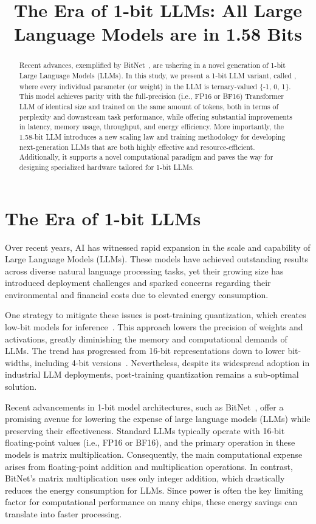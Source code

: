\title{The Era of 1-bit LLMs: All Large Language Models are in 1.58 Bits}

\begin{abstract}
Recent advances, exemplified by BitNet~\cite{bitnet}, are ushering in a novel generation of 1-bit Large Language Models (LLMs). In this study, we present a 1-bit LLM variant, called \textbf{}, where every individual parameter (or weight) in the LLM is ternary-valued \{-1, 0, 1\}. This model achieves parity with the full-precision (i.e., FP16 or BF16) Transformer LLM of identical size and trained on the same amount of tokens, both in terms of perplexity and downstream task performance, while offering substantial improvements in latency, memory usage, throughput, and energy efficiency. More importantly, the 1.58-bit LLM introduces a new scaling law and training methodology for developing next-generation LLMs that are both highly effective and resource-efficient. Additionally, it supports a novel computational paradigm and paves the way for designing specialized hardware tailored for 1-bit LLMs.
\end{abstract}

\section{The Era of 1-bit LLMs}

Over recent years, AI has witnessed rapid expansion in the scale and capability of Large Language Models (LLMs). These models have achieved outstanding results across diverse natural language processing tasks, yet their growing size has introduced deployment challenges and sparked concerns regarding their environmental and financial costs due to elevated energy consumption.

One strategy to mitigate these issues is post-training quantization, which creates low-bit models for inference~\cite{smoothquant, gptq, quip, quip_sharp}. This approach lowers the precision of weights and activations, greatly diminishing the memory and computational demands of LLMs. The trend has progressed from 16-bit representations down to lower bit-widths, including 4-bit versions~\cite{gptq, awq}. Nevertheless, despite its widespread adoption in industrial LLM deployments, post-training quantization remains a sub-optimal solution.

Recent advancements in 1-bit model architectures, such as BitNet~\cite{bitnet}, offer a promising avenue for lowering the expense of large language models (LLMs) while preserving their effectiveness. Standard LLMs typically operate with 16-bit floating-point values (i.e., FP16 or BF16), and the primary operation in these models is matrix multiplication. Consequently, the main computational expense arises from floating-point addition and multiplication operations. In contrast, BitNet’s matrix multiplication uses only integer addition, which drastically reduces the energy consumption for LLMs. Since power is often the key limiting factor for computational performance on many chips, these energy savings can translate into faster processing.

